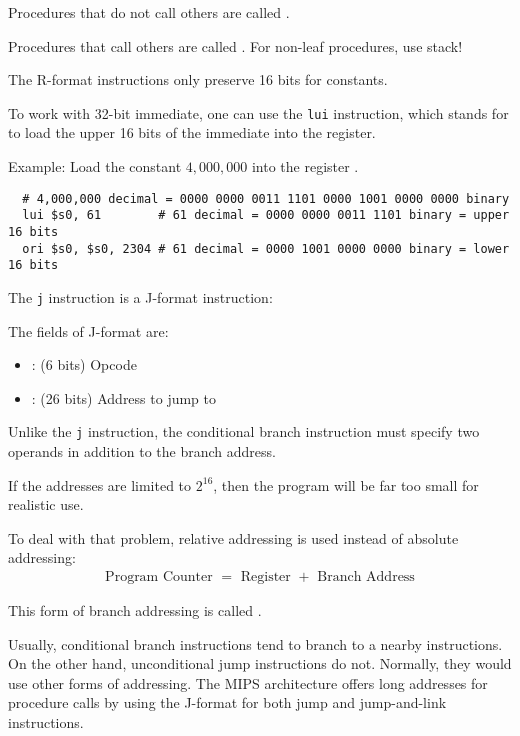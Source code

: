       \par Procedures that do not call others are called .
      \par Procedures that call others are called .
        For non-leaf procedures, use stack!

    \par The R-format instructions only preserve 16 bits for constants.
    \par To work with 32-bit immediate, one can use the \lstinline{lui}
      instruction, which stands for  to load the
      upper 16 bits of the immediate into the register.
    \par Example: Load the constant $4,000,000$ into the register .
    \begin{lstlisting}
  # 4,000,000 decimal = 0000 0000 0011 1101 0000 1001 0000 0000 binary
  lui $s0, 61        # 61 decimal = 0000 0000 0011 1101 binary = upper 16 bits
  ori $s0, $s0, 2304 # 61 decimal = 0000 1001 0000 0000 binary = lower 16 bits
    \end{lstlisting}

      \par The \lstinline{j} instruction is a J-format instruction:
      \par The fields of J-format are:
      \begin{itemize}
        \item {}: (6 bits) Opcode
        \item {}: (26 bits) Address to jump to
      \end{itemize}
      \par Unlike the \lstinline{j} instruction, the conditional branch
        instruction must specify two operands in addition to the branch address.
    
      \par If the addresses are limited to $2^{16}$, then the program will be
        far too small for realistic use.
      \par To deal with that problem, relative addressing is used instead of
        absolute addressing:
        \begin{align*}
          \mbox{ Program Counter } = \mbox{ Register } + \mbox { Branch Address }
        \end{align*}
      \par This form of branch addressing is called .
      \par Usually, conditional branch instructions tend to branch to a nearby
        instructions. On the other hand, unconditional jump instructions do
        not. Normally, they would use other forms of addressing. The MIPS
        architecture offers long addresses for procedure calls by using the
        J-format for both jump and jump-and-link instructions.
